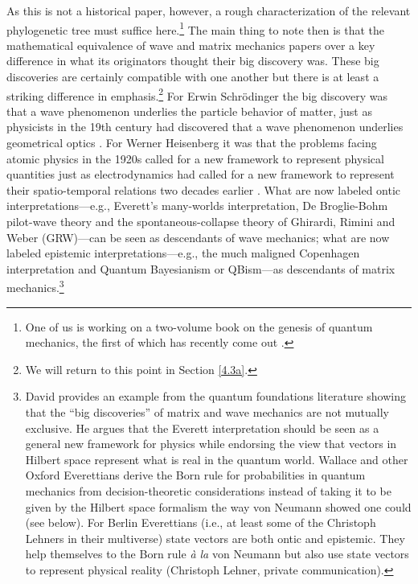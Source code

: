 As this is not a historical paper, however, a rough characterization of the relevant phylogenetic tree must suffice here.\footnote{One of us is working on a two-volume book on the genesis of quantum mechanics, the first of which has recently come out \citep{Duncan and Janssen 2019}.} The main thing to note then is that the mathematical equivalence of wave and matrix mechanics papers over a key difference in what its originators thought their big discovery was. These big discoveries are certainly compatible with one another but there is at least a striking difference in emphasis.\footnote{We will return to this point in Section \ref{4.3a}.} For Erwin Schr\"odinger the big discovery was that a wave phenomenon underlies the particle behavior of matter, just as physicists in the 19th century had discovered that a wave phenomenon underlies geometrical optics \citep{Joas and Lehner 2009}. For Werner Heisenberg it was that the problems facing atomic physics in the 1920s called for a new framework to represent physical quantities just as electrodynamics had called for a new framework to represent their spatio-temporal relations two decades earlier \citep[pp.\ 134--142]{Duncan and Janssen 2007, Janssen 2009}. What are now labeled ontic interpretations---e.g., Everett's many-worlds interpretation, De Broglie-Bohm pilot-wave theory and the spontaneous-collapse theory of Ghirardi, Rimini and Weber (GRW)---can be seen as descendants of wave mechanics; what are now labeled epistemic interpretations---e.g., the much maligned Copenhagen interpretation and Quantum Bayesianism or QBism---as descendants of matrix mechanics.\footnote{David \citet{Wallace 2019} provides an example from the quantum foundations literature showing that the ``big discoveries'' of matrix and wave mechanics are not mutually exclusive. He argues that the Everett interpretation should be seen as a general new framework for physics while endorsing the view that vectors in Hilbert space represent what is real in the quantum world. Wallace and other Oxford Everettians derive the Born rule for probabilities in quantum mechanics from decision-theoretic considerations instead of taking it to be given by the Hilbert space formalism the way von Neumann showed one could (see below). For Berlin Everettians (i.e., at least some of the Christoph Lehners  in their multiverse) state vectors are both ontic and epistemic. They help themselves to the Born rule \emph{\`a la} von Neumann but also use state vectors to represent physical reality (Christoph Lehner, private communication).\label{wallace-recipe}}

